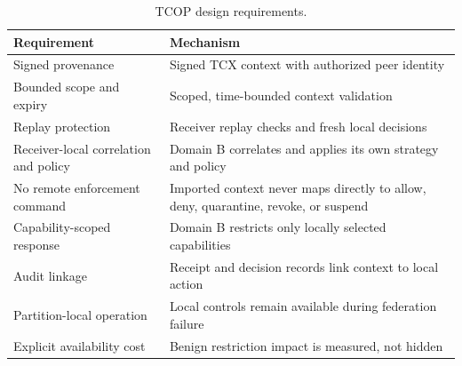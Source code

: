 \begin{table}[t]
\centering\footnotesize
\caption{TCOP design requirements.}
\begin{tabular}{@{}p{}@{\hspace{0.7em}}p{}@{}}\toprule
Requirement & Mechanism \\ \midrule
Signed provenance & Signed TCX context with authorized peer identity \\
Bounded scope and expiry & Scoped, time-bounded context validation \\
Replay protection & Receiver replay checks and fresh local decisions \\
Receiver-local correlation and policy & Domain B correlates and applies its own strategy and policy \\
No remote enforcement command & Imported context never maps directly to allow, deny, quarantine, revoke, or suspend \\
Capability-scoped response & Domain B restricts only locally selected capabilities \\
Audit linkage & Receipt and decision records link context to local action \\
Partition-local operation & Local controls remain available during federation failure \\
Explicit availability cost & Benign restriction impact is measured, not hidden \\ \bottomrule
\end{tabular}\label{tab:requirements}\end{table}
